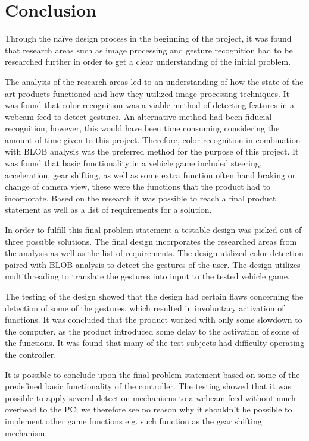 \section{Conclusion}
Through the naïve design process in the beginning of the project, it was found that research areas such as image processing and gesture recognition had to be researched further in order to get a clear understanding of the initial problem.
\bigskip

The analysis of the research areas led to an understanding of how the state of the art products functioned and how they utilized image-processing techniques. 
It was found that color recognition was a viable method of detecting features in a webcam feed to detect gestures. 
An alternative method had been fiducial recognition; 
however, this would have been time consuming considering the amount of time given to this project. 
Therefore, color recognition in combination with BLOB analysis was the preferred method for the purpose of this project. 
It was found that basic functionality in a vehicle game included steering, acceleration, gear shifting, as well as some extra function often hand braking or change of camera view, these were the functions that the product had to incorporate. 
Based on the research it was possible to reach a final product statement as well as a list of requirements for a solution.
\bigskip

In order to fulfill this final problem statement a testable design was picked out of three possible solutions. 
The final design incorporates the researched areas from the analysis as well as the list of requirements. 
The design utilized color detection paired with BLOB analysis to detect the gestures of the user. 
The design utilizes multithreading to translate the gestures into input to the tested vehicle game.
\bigskip

The testing of the design showed that the design had certain flaws concerning the detection of some of the gestures, which resulted in involuntary activation of functions. 
It was concluded that the product worked with only some slowdown to the computer, as the product introduced some delay to the activation of some of the functions. 
It was found that many of the test subjects had difficulty operating the controller.
\bigskip

It is possible to conclude upon the final problem statement based on some of the predefined basic functionality of the controller. The testing showed that it was possible to apply several detection mechanisms to a webcam feed without much overhead to the PC; we therefore see no reason why it shouldn't be possible to implement other game functions e.g. such function as the gear shifting mechanism. 
